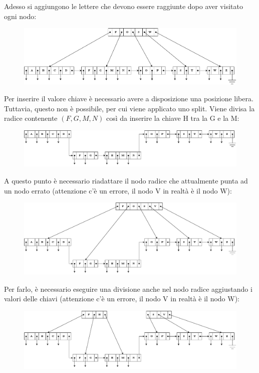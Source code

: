 \documentclass[a4paper]{article}
\begin{document}
	\noindent
	Adesso si aggiungono le lettere che devono essere raggiunte dopo aver visitato ogni nodo:
	\begin{figure}[!htp]
		\centering
		\includegraphics[width=\textwidth]{img/b+-tree-2.pdf}
	\end{figure}\newpage
	
	\noindent
	Per inserire il valore chiave è necessario avere a disposizione una posizione libera. Tuttavia, questo non è possibile, per cui viene applicato uno split. Viene divisa la radice contenente $\left(F,G,M,N\right)$ così da inserire la chiave H tra la G e la M:
	\begin{figure}[!htp]
		\centering
		\includegraphics[width=\textwidth]{img/b+-tree-3.pdf}
	\end{figure}
	
	\noindent
	A questo punto è necessario riadattare il nodo radice che attualmente punta ad un nodo errato (attenzione c'è un errore, il nodo V in realtà è il nodo W):
	\begin{figure}[!htp]
		\centering
		\includegraphics[width=\textwidth]{img/b+-tree-4.pdf}
	\end{figure}
	
	\noindent
	Per farlo, è necessario eseguire una divisione anche nel nodo radice aggiustando i valori delle chiavi (attenzione c'è un errore, il nodo V in realtà è il nodo W):
	\begin{figure}[!htp]
		\centering
		\includegraphics[width=\textwidth]{img/b+-tree-5.pdf}
	\end{figure}\newpage
	
\end{document}
